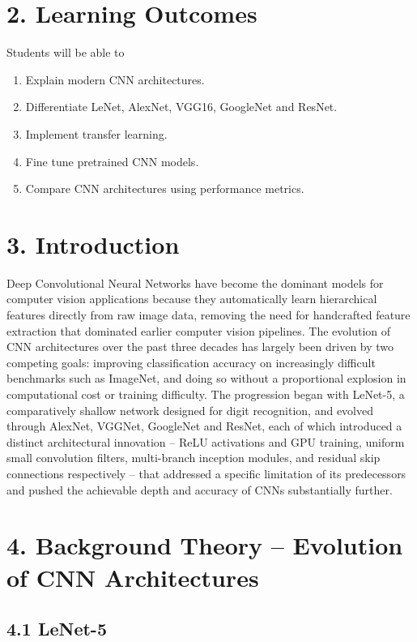 \documentclass[11pt,a4paper]{article}
\begin{document}
\section*{2. Learning Outcomes}

Students will be able to

\begin{enumerate}
\item Explain modern CNN architectures.
\item Differentiate LeNet, AlexNet, VGG16, GoogleNet and ResNet.
\item Implement transfer learning.
\item Fine tune pretrained CNN models.
\item Compare CNN architectures using performance metrics.
\end{enumerate}

\section*{3. Introduction}

Deep Convolutional Neural Networks have become the dominant models for computer vision applications because they automatically learn hierarchical features directly from raw image data, removing the need for handcrafted feature extraction that dominated earlier computer vision pipelines. The evolution of CNN architectures over the past three decades has largely been driven by two competing goals: improving classification accuracy on increasingly difficult benchmarks such as ImageNet, and doing so without a proportional explosion in computational cost or training difficulty. The progression began with LeNet-5, a comparatively shallow network designed for digit recognition, and evolved through AlexNet, VGGNet, GoogleNet and ResNet, each of which introduced a distinct architectural innovation -- ReLU activations and GPU training, uniform small convolution filters, multi-branch inception modules, and residual skip connections respectively -- that addressed a specific limitation of its predecessors and pushed the achievable depth and accuracy of CNNs substantially further.

\section*{4. Background Theory -- Evolution of CNN Architectures}

\subsection*{4.1 LeNet-5}
\end{document}
